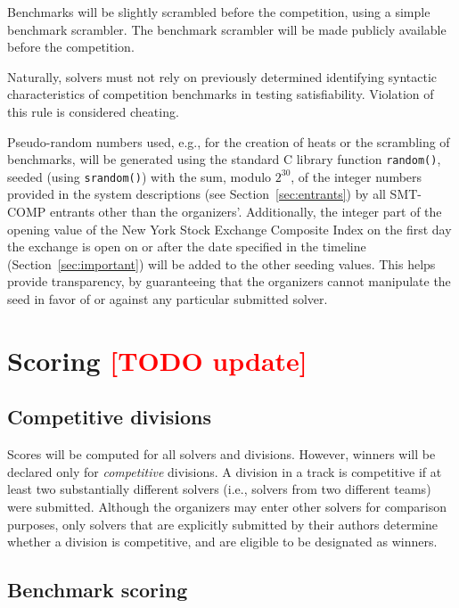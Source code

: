 \documentclass[12pt]{article}
\newcommand{\rem}[1]{\textcolor{red}{[#1]}}
\newcommand{\todo}[1]{\rem{TODO #1}}
\begin{document}
%
Benchmarks will be slightly scrambled before the competition, using a
simple benchmark scrambler.  The benchmark scrambler will be made
publicly available before the competition.

Naturally, solvers must not rely on previously determined identifying
syntactic characteristics of competition benchmarks in testing
satisfiability.  Violation of this rule is considered cheating.

%
Pseudo-random numbers used, e.g., for the creation of heats or the
scrambling of benchmarks, will be generated using the standard C
library function \texttt{random()}, seeded (using \texttt{srandom()})
with the sum, modulo $2^{30}$, of the integer numbers provided in the
system descriptions (see Section~\ref{sec:entrants}) by all SMT-COMP
entrants other than the organizers'.  Additionally, the integer part
of the opening value of the New York Stock Exchange Composite Index on
the first day the exchange is open on or after the date specified in
the timeline (Section~\ref{sec:important}) will be added to the other
seeding values.  This helps provide transparency, by guaranteeing that
the organizers cannot manipulate the seed in favor of or against any
particular submitted solver.


\section{Scoring \todo{update}}
\label{sec:scoring}

\subsection{Competitive divisions}
  
Scores will be computed for all solvers and divisions.  However,
winners will be declared only for \emph{competitive} divisions.  A
division in a track is competitive if at least two substantially
different solvers (i.e., solvers from two different teams) were
submitted.  Although the organizers may enter other solvers for
comparison purposes, only solvers that are explicitly submitted by
their authors determine whether a division is competitive, and are
eligible to be designated as winners.

\subsection{Benchmark scoring}
\label{sec:benchmark-scoring}
\end{document}
